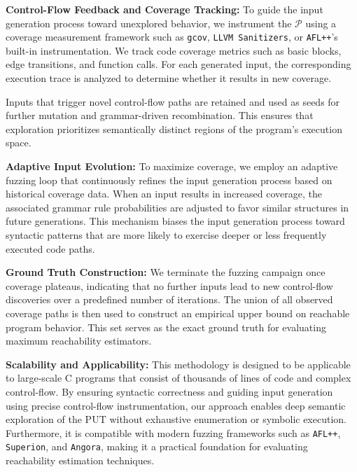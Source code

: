 \noindent\textbf{Control-Flow Feedback and Coverage Tracking:} To guide the input generation process toward unexplored behavior, we instrument the $\mathcal{P}$ using a coverage measurement framework such as \texttt{gcov}, \texttt{LLVM Sanitizers}, or \texttt{AFL++}’s built-in instrumentation. We track code coverage metrics such as basic blocks, edge transitions, and function calls. For each generated input, the corresponding execution trace is analyzed to determine whether it results in new coverage.

Inputs that trigger novel control-flow paths are retained and used as seeds for further mutation and grammar-driven recombination. This ensures that exploration prioritizes semantically distinct regions of the program's execution space.
\vspace{0.5em}

\noindent\textbf{Adaptive Input Evolution: } To maximize coverage, we employ an adaptive fuzzing loop that continuously refines the input generation process based on historical coverage data. When an input results in increased coverage, the associated grammar rule probabilities are adjusted to favor similar structures in future generations. This mechanism biases the input generation process toward syntactic patterns that are more likely to exercise deeper or less frequently executed code paths.
\vspace{0.5em}

\noindent\textbf{Ground Truth Construction:} We terminate the fuzzing campaign once coverage plateaus, indicating that no further inputs lead to new control-flow discoveries over a predefined number of iterations. The union of all observed coverage paths is then used to construct an empirical upper bound on reachable program behavior. This set serves as the exact ground truth for evaluating maximum reachability estimators.
\vspace{0.5em}

\noindent\textbf{Scalability and Applicability:} This methodology is designed to be applicable to large-scale C programs that consist of thousands of lines of code and complex control-flow. By ensuring syntactic correctness and guiding input generation using precise control-flow instrumentation, our approach enables deep semantic exploration of the PUT without exhaustive enumeration or symbolic execution. Furthermore, it is compatible with modern fuzzing frameworks such as \texttt{AFL++}, \texttt{Superion}, and \texttt{Angora}, making it a practical foundation for evaluating reachability estimation techniques.

